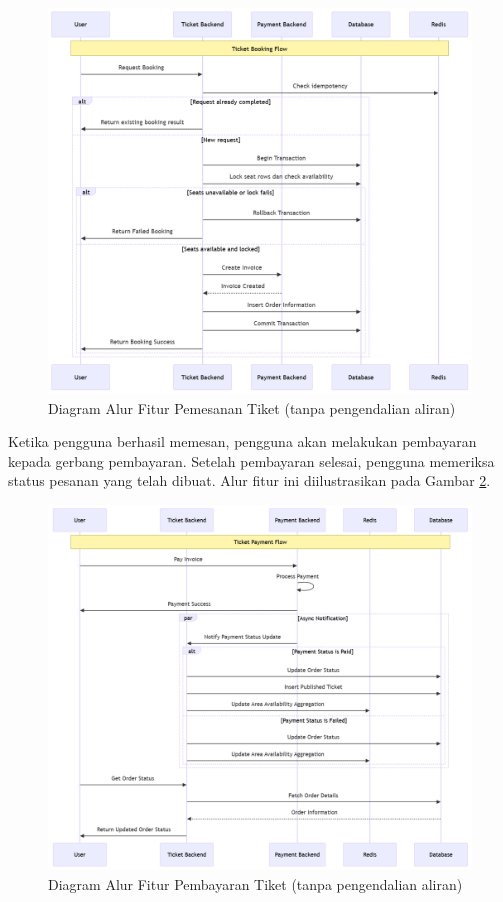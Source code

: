 \begin{figure}[H]
    \centering
    \includegraphics[width=1\textwidth]{resources/chapter-3/book-flow.png}
    \caption{Diagram Alur Fitur Pemesanan Tiket (tanpa pengendalian aliran)}
    \label{fig:flow-book-flow}
\end{figure}

\pagebreak

Ketika pengguna berhasil memesan, pengguna akan melakukan pembayaran kepada gerbang pembayaran. Setelah pembayaran selesai, pengguna memeriksa status pesanan yang telah dibuat. Alur fitur ini diilustrasikan pada Gambar \ref{fig:flow-order-payment-flow}.

\begin{figure}[h]
    \centering
    \includegraphics[width=1\textwidth]{resources/chapter-3/order-payment.png}
    \caption{Diagram Alur Fitur Pembayaran Tiket (tanpa pengendalian aliran)}
    \label{fig:flow-order-payment-flow}
\end{figure}

